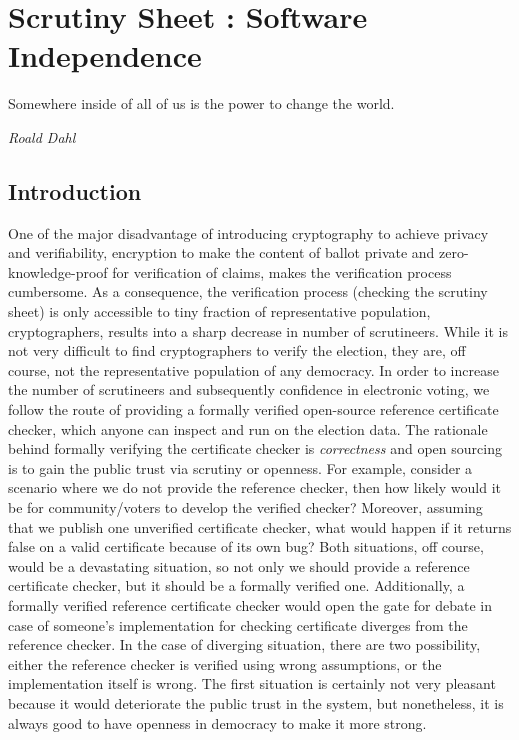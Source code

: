 \chapter{Scrutiny Sheet : Software Independence}
\label{cha:software_independence}

\epigraph{Somewhere inside of all of us is the power to change the world.} 
{\textit{Roald Dahl }}

\section{Introduction}


One of the major disadvantage of introducing cryptography 
to achieve privacy and verifiability, encryption to make the 
content of ballot private and zero-knowledge-proof for verification of claims, makes the verification 
process cumbersome. As a consequence, the verification process (checking the scrutiny sheet) is only accessible 
to tiny fraction of representative population, cryptographers, results into a sharp decrease in number of scrutineers. 
While it is not very difficult to find cryptographers to verify the election, 
they are, off course, not the representative population of any democracy. 
In order to increase the number of scrutineers and subsequently confidence in electronic voting, we follow the 
route of providing a formally verified open-source 
reference certificate checker, which anyone can inspect and run on the election data. 
  The rationale behind formally verifying the certificate checker is \emph{correctness}
  and open sourcing is to gain the public trust  via scrutiny or openness.  
  For example, consider a scenario where we do not provide the reference checker,
  then how 
  likely would it be for community/voters to develop the 
  verified checker? Moreover, assuming that we publish one unverified certificate checker,
  what would happen if it returns false on a valid certificate because of its own bug? 
  Both situations, off course, would be a devastating situation, so not only we 
  should provide a reference certificate checker, but it should be a formally verified one. 
  Additionally, a formally verified reference certificate checker would open the gate for
  debate in case of someone's implementation for checking certificate diverges from the reference checker.
In the case of diverging situation, there are two possibility, either the reference checker is verified 
using wrong assumptions,  or the implementation itself is wrong.  The first situation is certainly 
not very pleasant because it would deteriorate the public trust in the system, but nonetheless, it is always
good to  have openness in democracy to make it more strong. 
  

